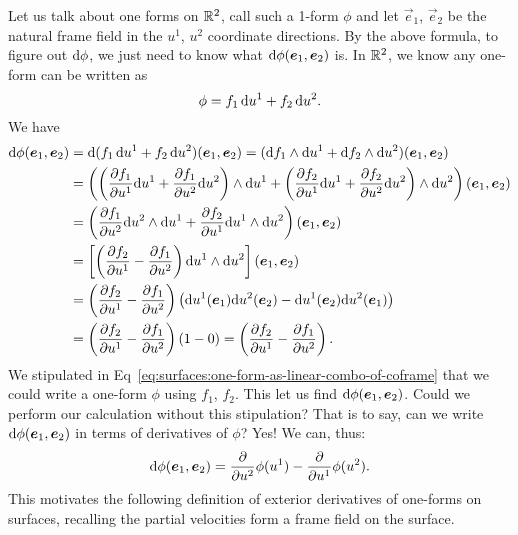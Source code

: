 Let us talk about one forms on $\mathbb{R}^{2}$, call such a 1-form $\phi$
and let $\vec{e}_{1}$, $\vec{e}_{2}$ be the natural frame field in the
$u^{1}$, $u^{2}$ coordinate directions. By the above formula, to figure
out $\mathrm{d}\phi$, we just need to know what $\mathrm{d}\phi(\boldsymbol{e}_{1}, \boldsymbol{e}_{2})$
is. In $\mathbb{R}^{2}$, we know any one-form can be written as
\begin{equation}\label{eq:surfaces:one-form-as-linear-combo-of-coframe}
\phi = f_{1}\,\mathrm{d} u^{1} + f_{2}\,\mathrm{d} u^{2}.
\end{equation}
We have
\begin{subequations}
\begin{align}
\mathrm{d}\phi(\boldsymbol{e}_{1}, \boldsymbol{e}_{2})
&=\mathrm{d}(f_{1}\,\mathrm{d} u^{1} + f_{2}\,\mathrm{d} u^{2})(\boldsymbol{e}_{1}, \boldsymbol{e}_{2})
=(\mathrm{d} f_{1}\wedge\mathrm{d} u^{1} + \mathrm{d} f_{2}\wedge\mathrm{d} u^{2})(\boldsymbol{e}_{1}, \boldsymbol{e}_{2})\\
&=\left(\left(\frac{\partial f_{1}}{\partial u^{1}}\mathrm{d} u^{1} + \frac{\partial f_{1}}{\partial u^{2}}\mathrm{d} u^{2}\right)\wedge\mathrm{d} u^{1} + \left(\frac{\partial f_{2}}{\partial u^{1}}\mathrm{d} u^{1} + \frac{\partial f_{2}}{\partial u^{2}}\mathrm{d} u^{2}\right)\wedge\mathrm{d} u^{2}\right)(\boldsymbol{e}_{1}, \boldsymbol{e}_{2})\\
&=\left(\frac{\partial f_{1}}{\partial u^{2}}\mathrm{d} u^{2}\wedge\mathrm{d} u^{1}
+\frac{\partial f_{2}}{\partial u^{1}}\mathrm{d} u^{1}\wedge\mathrm{d} u^{2}\right)(\boldsymbol{e}_{1}, \boldsymbol{e}_{2})\\
&=\left[\left(\frac{\partial f_{2}}{\partial u^{1}} - \frac{\partial f_{1}}{\partial u^{2}}\right)\mathrm{d} u^{1}\wedge\mathrm{d} u^{2}\right](\boldsymbol{e}_{1}, \boldsymbol{e}_{2})\\
&=\left(\frac{\partial f_{2}}{\partial u^{1}} - \frac{\partial f_{1}}{\partial u^{2}}\right)\left(\mathrm{d} u^{1}(\boldsymbol{e}_{1})\mathrm{d} u^{2}(\boldsymbol{e}_{2})-\mathrm{d} u^{1}(\boldsymbol{e}_{2})\mathrm{d} u^{2}(\boldsymbol{e}_{1})\right)\\
&=\left(\frac{\partial f_{2}}{\partial u^{1}} - \frac{\partial f_{1}}{\partial u^{2}}\right)(1-0)=\left(\frac{\partial f_{2}}{\partial u^{1}} - \frac{\partial f_{1}}{\partial u^{2}}\right).
\end{align}
\end{subequations}
We stipulated in
Eq~\eqref{eq:surfaces:one-form-as-linear-combo-of-coframe} that we could
write a one-form $\phi$ using $f_{1}$, $f_{2}$. This let us find $\mathrm{d}\phi(\boldsymbol{e}_{1}, \boldsymbol{e}_{2})$.
Could we perform our calculation without this stipulation? That is to
say, can we write $\mathrm{d}\phi(\boldsymbol{e}_{1}, \boldsymbol{e}_{2})$ in terms of
derivatives of $\phi$? Yes! We can, thus:
\begin{equation}
\mathrm{d}\phi(\boldsymbol{e}_{1}, \boldsymbol{e}_{2}) = \frac{\partial}{\partial u^{2}}\phi(u^{1})-
\frac{\partial}{\partial u^{1}}\phi(u^{2}).
\end{equation}
This motivates the following definition of exterior derivatives of
one-forms on surfaces, recalling the partial velocities form a frame
field on the surface.

